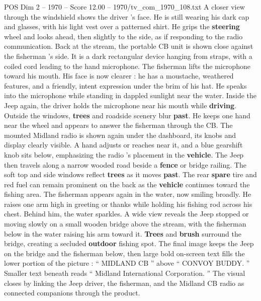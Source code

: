 \begin{textsample}{POS Dim 2 – 1970 – Score 12.00 – 1970/tv\_com\_1970\_108.txt}
A closer view through the windshield shows the driver ’s face.
He is still wearing his dark cap and glasses, with his light vest over a patterned shirt.
He grips the \textbf{steering} wheel and looks ahead, then slightly to the side, as if responding to the radio communication.
Back at the stream, the portable CB unit is shown close against the fisherman ’s side.
It is a dark rectangular device hanging from straps, with a coiled cord leading to the hand microphone.
The fisherman lifts the microphone toward his mouth.
His face is now clearer : he has a moustache, weathered features, and a friendly, intent expression under the brim of his hat.
He speaks into the microphone while standing in dappled sunlight near the water.
Inside the Jeep again, the driver holds the microphone near his mouth while \textbf{driving}.
Outside the windows, \textbf{trees} and roadside scenery blur \textbf{past}.
He keeps one hand near the wheel and appears to answer the fisherman through the CB.
The mounted Midland radio is shown again under the dashboard, its knobs and display clearly visible.
A hand adjusts or reaches near it, and a blue gearshift knob sits below, emphasizing the radio ’s placement in the \textbf{vehicle}.
The Jeep then travels along a narrow wooded road beside a \textbf{fence} or bridge railing.
The soft top and side windows reflect \textbf{trees} as it moves \textbf{past}.
The rear \textbf{spare} tire and red fuel can remain prominent on the back as the \textbf{vehicle} continues toward the fishing area.
The fisherman appears again in the water, now smiling broadly.
He raises one arm high in greeting or thanks while holding his fishing rod across his chest.
Behind him, the water sparkles.
A wide view reveals the Jeep stopped or moving slowly on a small wooden bridge above the stream, with the fisherman below in the water raising his arm toward it. \textbf{Trees} and \textbf{brush} surround the bridge, creating a secluded \textbf{outdoor} fishing spot.
The final image keeps the Jeep on the bridge and the fisherman below, then large bold on-screen text fills the lower portion of the picture : “ MIDLAND CB ” above “ CONVOY BUDDY. ” Smaller text beneath reads “ Midland International Corporation. ” The visual closes by linking the Jeep driver, the fisherman, and the Midland CB radio as connected companions through the product.

\end{textsample}
